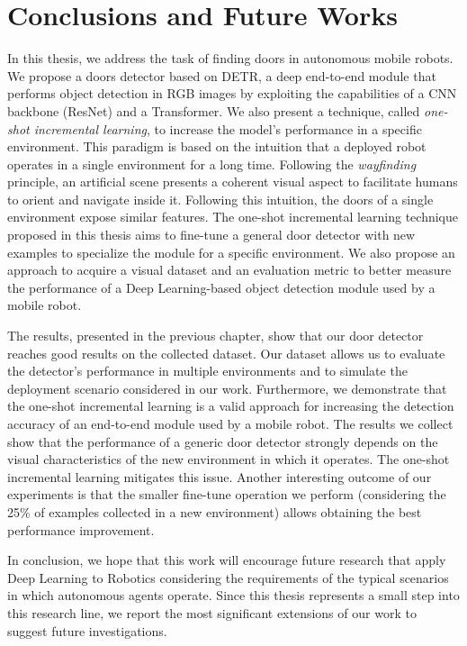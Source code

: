\chapter{Conclusions and Future Works}
\label{sec:chapter6}
\thispagestyle{empty}

In this thesis, we address the task of finding doors in autonomous mobile robots. We propose a doors detector based on DETR, a deep end-to-end module that performs object detection in RGB images by exploiting the capabilities of a CNN backbone (ResNet) and a Transformer. We also present a technique, called \textit{one-shot incremental learning}, to increase the model's performance in a specific environment. This paradigm is based on the intuition that a deployed robot operates in a single environment for a long time. Following the \textit{wayfinding} principle, an artificial scene presents a coherent visual aspect to facilitate humans to orient and navigate inside it. Following this intuition, the doors of a single environment expose similar features. The one-shot incremental learning technique proposed in this thesis aims to fine-tune a general door detector with new examples to specialize the module for a specific environment. We also propose an approach to acquire a visual dataset and an evaluation metric to better measure the performance of a Deep Learning-based object detection module used by a mobile robot. 

The results, presented in the previous chapter, show that our door detector reaches good results on the collected dataset. Our dataset allows us to evaluate the detector's performance in multiple environments and to simulate the deployment scenario considered in our work. Furthermore, we demonstrate that the one-shot incremental learning is a valid approach for increasing the detection accuracy of an end-to-end module used by a mobile robot. The results we collect show that the performance of a generic door detector strongly depends on the visual characteristics of the new environment in which it operates. The one-shot incremental learning mitigates this issue. Another interesting outcome of our experiments is that the smaller fine-tune operation we perform (considering the 25\% of examples collected in a new environment) allows obtaining the best performance improvement. 

In conclusion, we hope that this work will encourage future research that apply Deep Learning to Robotics considering the requirements of the typical scenarios in which autonomous agents operate. Since this thesis represents a small step into this research line, we report the most significant extensions of our work to suggest future investigations.

